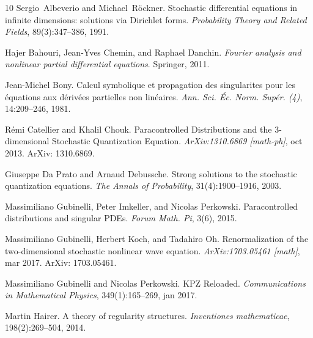 \documentclass[a4paper,11pt]{article}
\newcommand{\tmtextit}[1]{{\itshape{#1}}}
\begin{document}
\begin{thebibliography}{10}
  Sergio~Albeverio  and  Michael~R{\"o}ckner.
  {\newblock}Stochastic differential equations in infinite dimensions:
  solutions via Dirichlet forms. {\newblock}\tmtextit{Probability Theory and
  Related Fields}, 89(3):347--386, 1991.{\newblock}
  
  Hajer Bahouri, Jean-Yves Chemin, and  Raphael
  Danchin. {\newblock}\tmtextit{Fourier analysis and nonlinear partial
  differential equations}. {\newblock}Springer, 2011.{\newblock}
  
  Jean-Michel Bony. {\newblock}Calcul symbolique et
  propagation des singularites pour les {\'e}quations aux d{\'e}riv{\'e}es
  partielles non lin{\'e}aires. {\newblock}\tmtextit{Ann. Sci. {\'E}c. Norm.
  Sup{\'e}r. (4)}, 14:209--246, 1981.{\newblock}
  
  R{\'e}mi Catellier  and  Khalil
  Chouk. {\newblock}Paracontrolled Distributions and the 3-dimensional
  Stochastic Quantization Equation. {\newblock}\tmtextit{ArXiv:1310.6869
  [math-ph]}, oct 2013. {\newblock}ArXiv: 1310.6869.{\newblock}
  
  Giuseppe Da Prato  and  Arnaud Debussche.
  {\newblock}Strong solutions to the stochastic quantization equations.
  {\newblock}\tmtextit{The Annals of Probability}, 31(4):1900--1916,
  2003.{\newblock}
  
  Massimiliano Gubinelli, Peter
  Imkeller, and  Nicolas Perkowski. {\newblock}Paracontrolled distributions
  and singular PDEs. {\newblock}\tmtextit{Forum Math. Pi}, 3(6),
  2015.{\newblock}
  
  Massimiliano Gubinelli, Herbert
  Koch, and  Tadahiro Oh. {\newblock}Renormalization of the two-dimensional
  stochastic nonlinear wave equation. {\newblock}\tmtextit{ArXiv:1703.05461
  [math]}, mar 2017. {\newblock}ArXiv: 1703.05461.{\newblock}
  
  Massimiliano Gubinelli  and  Nicolas
  Perkowski. {\newblock}KPZ Reloaded. {\newblock}\tmtextit{Communications in
  Mathematical Physics}, 349(1):165--269, jan 2017.{\newblock}
  
  Martin Hairer. {\newblock}A theory of
  regularity structures. {\newblock}\tmtextit{Inventiones mathematicae},
  198(2):269--504, 2014.{\newblock}
  

\end{thebibliography}
\end{document}
